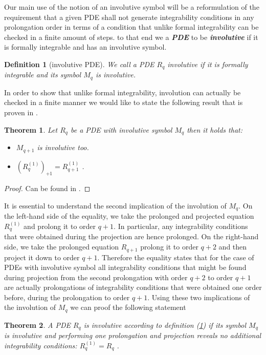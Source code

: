\documentclass[a4paper,12pt, DIV=14, BCOR=5mm, twoside, headsepline, numbers=noenddot]{scrbook}
\newtheorem{theorem}{Theorem}[section]
\newtheorem{definition}{Definition}[section]
\begin{document}
Our main use of the notion of an involutive symbol will be a reformulation of the requirement that a given PDE shall not generate integrability conditions in any prolongation order in terms of a condition that unlike formal integrability can be checked in a finite amount of steps. to that end we a \textit{\textbf{PDE}} to be \textit{\textbf{involutive}} if it is formally integrable and has an involutive symbol.
\begin{definition}[involutive PDE] \label{invol}
We call a PDE $R_q$ involutive if it is formally integrable and its symbol $M_q$ is involutive.
\end{definition}
In order to show that unlike formal integrability, involution can actually be checked in a finite manner we would like to state the following result that is proven in \cite{seiler1994analysis}.
\begin{theorem}\label{invoCons}
Let $R_q$ be a PDE with involutive symbol $M_q$ then it holds that:
\begin{itemize}
    \item $M_{q+1}$ is involutive too.
    \item $(R_{q}^{(1)})_{+1} = R_{q+1}^{(1)}$ .
\end{itemize}
\end{theorem}
\begin{proof}
Can be found in \cite{seiler1994analysis}.
\end{proof}
It is essential to understand the second implication of the involution of $M_q$. On the left-hand side of the equality, we take the prolonged and projected equation $R_q^{(1)}$ and prolong it to order $q+1$. In particular, any integrability conditions that were obtained during the projection are hence prolonged. On the right-hand side, we take the prolonged equation $R_{q+1}$ prolong it to order $q+2$ and then project it down to order $q+1$. Therefore the equality states that for the case of PDEs with involutive symbol all integrability conditions that might be found during projection from the second prolongation with order $q+2$ to order $q+1$ are actually prolongations of integrability conditions that were obtained one order before, during the prolongation to order $q+1$.
Using these two implications of the involution of $M_q$ we can proof the following statement
\begin{theorem}
A PDE $R_q$ is involutive according to definition (\ref{invol}) if its symbol $M_q$ is involutive and performing one prolongation and projection reveals no additional integrability conditions: $R_q^{(1)} = R_q$ .
\end{theorem}
\end{document}
